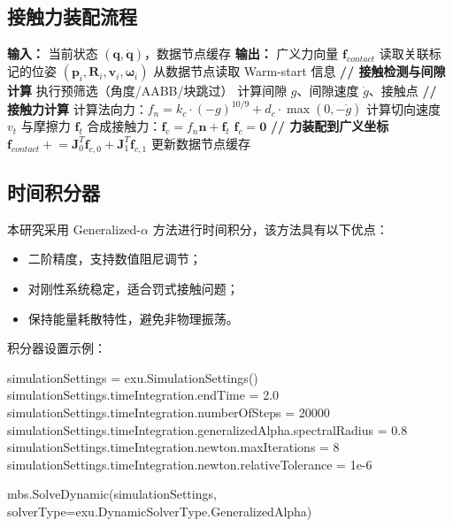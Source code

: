 \documentclass[12pt]{ctexart}
\begin{document}
\subsection{接触力装配流程}

\begin{algorithm}[htbp]
\caption{罚式接触力计算与装配}
\begin{algorithmic}[1]
\State \textbf{输入：} 当前状态 $(\mathbf{q}, \dot{\mathbf{q}})$，数据节点缓存
\State \textbf{输出：} 广义力向量 $\mathbf{f}_{contact}$
\State
{}
  \State 读取关联标记的位姿 $(\mathbf{p}_i, \mathbf{R}_i, \mathbf{v}_i, \boldsymbol{\omega}_i)$
  \State 从数据节点读取 Warm-start 信息
  \State
  \State \textbf{// 接触检测与间隙计算}
  \State 执行预筛选（角度/AABB/块跳过）
    \State 计算间隙 $g$、间隙速度 $\dot{g}$、接触点
  \EndFor
  \State
  \State \textbf{// 接触力计算}
    \State 计算法向力：$f_n = k_c \cdot (-g)^{10/9} + d_c \cdot \max(0, -\dot{g})$
    \State 计算切向速度 $v_t$ 与摩擦力 $\mathbf{f}_t$
    \State 合成接触力：$\mathbf{f}_c = f_n \mathbf{n} + \mathbf{f}_t$
  \Else
    \State $\mathbf{f}_c = \mathbf{0}$
  \EndIf
  \State
  \State \textbf{// 力装配到广义坐标}
  \State $\mathbf{f}_{contact} \mathrel{+}= \mathbf{J}_0^T \mathbf{f}_{c,0} + \mathbf{J}_1^T \mathbf{f}_{c,1}$
  \State 更新数据节点缓存
\EndFor
\end{algorithmic}
\end{algorithm}

\subsection{时间积分器}

本研究采用 Generalized-$\alpha$ 方法进行时间积分，该方法具有以下优点：
\begin{itemize}
  \item 二阶精度，支持数值阻尼调节；
  \item 对刚性系统稳定，适合罚式接触问题；
  \item 保持能量耗散特性，避免非物理振荡。
\end{itemize}

积分器设置示例：
\begin{pythoncode}[仿真设置]
simulationSettings = exu.SimulationSettings()
simulationSettings.timeIntegration.endTime = 2.0
simulationSettings.timeIntegration.numberOfSteps = 20000
simulationSettings.timeIntegration.generalizedAlpha.spectralRadius = 0.8
simulationSettings.timeIntegration.newton.maxIterations = 8
simulationSettings.timeIntegration.newton.relativeTolerance = 1e-6

mbs.SolveDynamic(simulationSettings, 
    solverType=exu.DynamicSolverType.GeneralizedAlpha)
\end{pythoncode}
\end{document}
